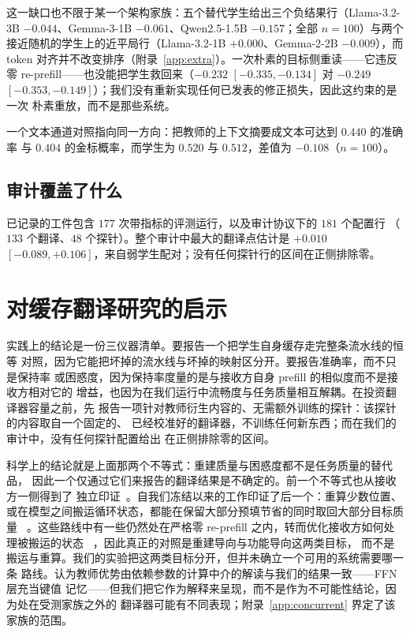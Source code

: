 \documentclass[10pt,a4paper,fontset=fandol]{ctexart}
\begin{document}
这一缺口也不限于某一个架构家族：五个替代学生给出三个负结果行（Llama-3.2-3B
$-0.044$、Gemma-3-1B $-0.061$、Qwen2.5-1.5B $-0.157$；全部 $n{=}100$）与两个
接近随机的学生上的近平局行（Llama-3.2-1B $+0.000$、Gemma-2-2B $-0.009$），而
token 对齐并不改变排序（附录~\ref{app:extra}）。一次朴素的目标侧重读——它违反
零 re-prefill——也没能把学生救回来（$-0.232$ $[-0.335,-0.134]$ 对 $-0.249$
$[-0.353,-0.149]$）；我们没有重新实现任何已发表的修正损失，因此这约束的是一次
朴素重放，而不是那些系统。

一个文本通道对照指向同一方向：把教师的上下文摘要成文本可达到 $0.440$ 的准确率
与 $0.404$ 的金标概率，而学生为 $0.520$ 与 $0.512$，差值为 $-0.108$（$n{=}100$）。

\subsection{审计覆盖了什么}

已记录的工件包含 $177$ 次带指标的评测运行，以及审计协议下的 $181$ 个配置行
（$133$ 个翻译、$48$ 个探针）。整个审计中最大的翻译点估计是 $+0.010$
$[-0.089,+0.106]$，来自弱学生配对；没有任何探针行的区间在正侧排除零。

\section{对缓存翻译研究的启示}
\label{sec:implications}

实践上的结论是一份三仪器清单。要报告一个把学生自身缓存走完整条流水线的恒等
对照，因为它能把坏掉的流水线与坏掉的映射区分开。要报告准确率，而不只是保持率
或困惑度，因为保持率度量的是与接收方自身 prefill 的相似度而不是接收方相对它的
增益，也因为在我们运行中流畅度与任务质量相互解耦。在投资翻译器容量之前，先
报告一项针对教师衍生内容的、无需额外训练的探针：该探针的内容取自一个固定的、
已经校准好的翻译器，不训练任何新东西；而在我们的审计中，没有任何探针配置给出
在正侧排除零的区间。

科学上的结论就是上面那两个不等式：重建质量与困惑度都不是任务质量的替代品，
因此一个仅通过它们来报告的翻译结果是不确定的。前一个不等式也从接收方一侧得到了
独立印证~\citep{cachelink2026}。自我们冻结以来的工作印证了后一个：重算少数位置、
或在模型之间搬运循环状态，都能在保留大部分预填节省的同时取回大部分目标质量
~\citep{raracache2026,acct2026,latentport2026}。这些路线中有一些仍然处在严格零
re-prefill 之内，转而优化接收方如何处理被搬运的状态
~\citep{cachelink2026,kvlingo2026}，因此真正的对照是重建导向与功能导向这两类目标，
而不是搬运与重算。我们的实验把这两类目标分开，但并未确立一个可用的系统需要哪一条
路线。认为教师优势由依赖参数的计算中介的解读与我们的结果一致——FFN 层充当键值
记忆——但我们把它作为解释来呈现，而不是作为不可能性结论，因为处在受测家族之外的
翻译器可能有不同表现；附录~\ref{app:concurrent} 界定了该家族的范围。
\end{document}
